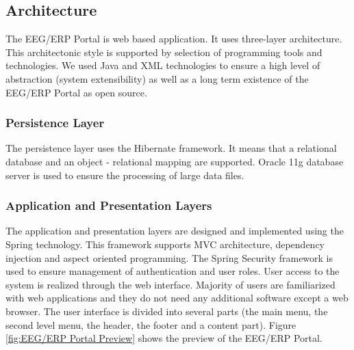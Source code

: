\documentclass[conference]{IEEEtran}
\begin{document}
\subsection{Architecture}

The EEG/ERP Portal is web based application. It uses three-layer architecture. This architectonic style is supported by selection of programming tools and technologies. We used Java
and XML technologies to ensure a high level of abstraction (system extensibility) as well as a long term existence of the EEG/ERP Portal as open source.

\subsubsection{Persistence Layer}

The persistence layer uses the Hibernate framework. It means that a relational database and an object - relational mapping are supported. Oracle 11g database server is used to ensure the processing of large data files.

\subsubsection{Application and Presentation Layers}

The application and presentation layers are designed and implemented using the Spring technology. This framework supports MVC architecture, dependency
injection and aspect oriented programming. The Spring Security framework is used to ensure management of authentication and user roles. User access to the system is realized through the web interface. Majority of users are familiarized with web applications and they do not need any additional software except a web browser. The user interface is divided into several parts (the main menu, the second level menu, the header, the footer and a content part). Figure \ref{fig:EEG/ERP Portal Preview} shows the preview of the EEG/ERP Portal.
\end{document}
